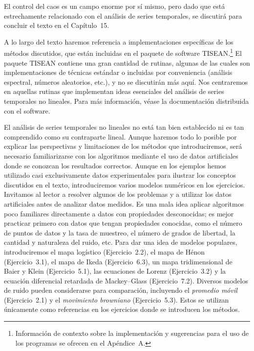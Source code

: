 \documentclass[10pt,a4paper]{book}
\begin{document}
\bigskip

El control del caos es un campo enorme por sí mismo, pero dado que está estrechamente relacionado con el análisis de series temporales, se discutirá para concluir el texto en el Capítulo~15.

A lo largo del texto haremos referencia a implementaciones específicas de los métodos discutidos, que están incluidas en el paquete de software TISEAN.\footnote{Información de contexto sobre la implementación y sugerencias para el uso de los programas se ofrecen en el Apéndice~A.} El paquete TISEAN contiene una gran cantidad de rutinas, algunas de las cuales son implementaciones de técnicas estándar o incluidas por conveniencia (análisis espectral, números aleatorios, etc.), y no se discutirán más aquí. Nos centraremos en aquellas rutinas que implementan ideas esenciales del análisis de series temporales no lineales. Para más información, véase la documentación distribuida con el software.

El análisis de series temporales no lineales no está tan bien establecido ni es tan comprendido como su contraparte lineal. Aunque haremos todo lo posible por explicar las perspectivas y limitaciones de los métodos que introduciremos, será necesario familiarizarse con los algoritmos mediante el uso de datos artificiales donde se conozcan los resultados correctos. Aunque en los ejemplos hemos utilizado casi exclusivamente datos experimentales para ilustrar los conceptos discutidos en el texto, introduciremos varios modelos numéricos en los ejercicios. Invitamos al lector a resolver algunos de los problemas y a utilizar los datos artificiales antes de analizar datos medidos. Es una mala idea aplicar algoritmos poco familiares directamente a datos con propiedades desconocidas; es mejor practicar primero con datos que tengan propiedades conocidas, como el número de puntos de datos y la tasa de muestreo, el número de grados de libertad, la cantidad y naturaleza del ruido, etc. Para dar una idea de modelos populares, introduciremos el mapa logístico (Ejercicio~2.2), el mapa de Hénon (Ejercicio~3.1), el mapa de Ikeda (Ejercicio~6.3), un mapa tridimensional de Baier y Klein (Ejercicio~5.1), las ecuaciones de Lorenz (Ejercicio~3.2) y la ecuación diferencial retardada de Mackey–Glass (Ejercicio~7.2). Diversos modelos de ruido pueden considerarse para comparación, incluyendo el \emph{promedio móvil} (Ejercicio~2.1) y el \emph{movimiento browniano} (Ejercicio~5.3). Estos se utilizan únicamente como referencias en los ejercicios donde se introducen los métodos.
\end{document}
